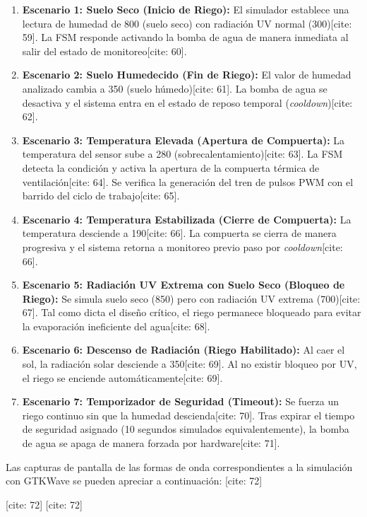 \begin{enumerate}
	\item \textbf{Escenario 1: Suelo Seco (Inicio de Riego):} El simulador establece una lectura de humedad de 800 (suelo seco) con radiación UV normal (300)[cite: 59]. La FSM responde activando la bomba de agua de manera inmediata al salir del estado de monitoreo[cite: 60].
	\item \textbf{Escenario 2: Suelo Humedecido (Fin de Riego):} El valor de humedad analizado cambia a 350 (suelo húmedo)[cite: 61]. La bomba de agua se desactiva y el sistema entra en el estado de reposo temporal (\textit{cooldown})[cite: 62].
	\item \textbf{Escenario 3: Temperatura Elevada (Apertura de Compuerta):} La temperatura del sensor sube a 280 (sobrecalentamiento)[cite: 63]. La FSM detecta la condición y activa la apertura de la compuerta térmica de ventilación[cite: 64]. Se verifica la generación del tren de pulsos PWM con el barrido del ciclo de trabajo[cite: 65].
	\item \textbf{Escenario 4: Temperatura Estabilizada (Cierre de Compuerta):} La temperatura desciende a 190[cite: 66]. La compuerta se cierra de manera progresiva y el sistema retorna a monitoreo previo paso por \textit{cooldown}[cite: 66].
	\item \textbf{Escenario 5: Radiación UV Extrema con Suelo Seco (Bloqueo de Riego):} Se simula suelo seco (850) pero con radiación UV extrema (700)[cite: 67]. Tal como dicta el diseño crítico, el riego permanece bloqueado para evitar la evaporación ineficiente del agua[cite: 68].
	\item \textbf{Escenario 6: Descenso de Radiación (Riego Habilitado):} Al caer el sol, la radiación solar desciende a 350[cite: 69]. Al no existir bloqueo por UV, el riego se enciende automáticamente[cite: 69].
	\item \textbf{Escenario 7: Temporizador de Seguridad (Timeout):} Se fuerza un riego continuo sin que la humedad descienda[cite: 70]. Tras expirar el tiempo de seguridad asignado (10 segundos simulados equivalentemente), la bomba de agua se apaga de manera forzada por hardware[cite: 71].
\end{enumerate}

Las capturas de pantalla de las formas de onda correspondientes a la simulación con GTKWave se pueden apreciar a continuación: [cite: 72]

 [cite: 72]
\label{fig:captura_simulacion_riego} [cite: 72]

